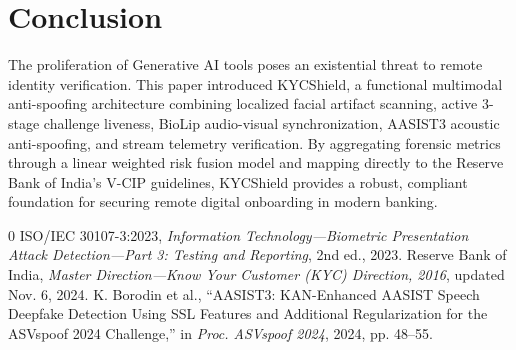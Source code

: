 \documentclass[conference]{IEEEtran}
\begin{document}
\section{Conclusion}
The proliferation of Generative AI tools poses an existential threat to remote identity verification. This paper introduced KYCShield, a functional multimodal anti-spoofing architecture combining localized facial artifact scanning, active 3-stage challenge liveness, BioLip audio-visual synchronization, AASIST3 acoustic anti-spoofing, and stream telemetry verification. By aggregating forensic metrics through a linear weighted risk fusion model and mapping directly to the Reserve Bank of India's V-CIP guidelines, KYCShield provides a robust, compliant foundation for securing remote digital onboarding in modern banking.

\begin{thebibliography}{0}
 ISO/IEC 30107-3:2023, \textit{Information Technology---Biometric Presentation Attack Detection---Part 3: Testing and Reporting}, 2nd ed., 2023.
 Reserve Bank of India, \textit{Master Direction---Know Your Customer (KYC) Direction, 2016}, updated Nov. 6, 2024.
 K. Borodin et al., ``AASIST3: KAN-Enhanced AASIST Speech Deepfake Detection Using SSL Features and Additional Regularization for the ASVspoof 2024 Challenge,'' in \textit{Proc. ASVspoof 2024}, 2024, pp. 48--55.
\end{thebibliography}
\end{document}
